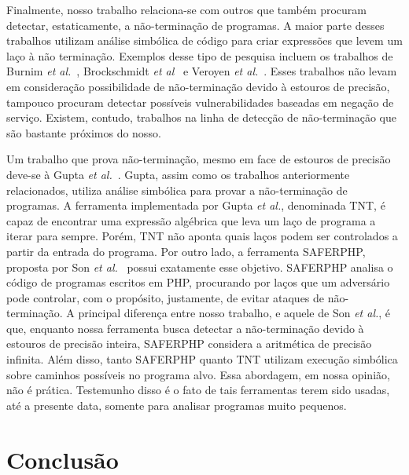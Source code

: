 \documentclass{llncs}
\begin{document}
Finalmente, nosso trabalho relaciona-se com outros que também procuram
detectar, estaticamente, a não-terminação de programas.
A maior parte desses trabalhos utilizam análise simbólica de código para criar
expressões que levem um laço à não terminação.
Exemplos desse tipo de pesquisa incluem os trabalhos de Burnim
{\em et al.}~\cite{Burnim09}, Brockschmidt {\em et al}~\cite{Brockschmidt11} e
Veroyen {\em et al.}~\cite{Velroyen08}.
Esses trabalhos não levam em consideração possibilidade de não-terminação
devido à estouros de precisão, tampouco procuram detectar possíveis
vulnerabilidades baseadas em negação de serviço.
Existem, contudo, trabalhos na linha de detecção de não-terminação que são
bastante próximos do nosso.

Um trabalho que prova não-terminação, mesmo em face de estouros de precisão
deve-se à Gupta {\em et al.}~\cite{Gupta08}.
Gupta, assim como os trabalhos anteriormente relacionados, utiliza análise
simbólica para provar a não-terminação de programas.
A ferramenta implementada por Gupta {\em et al.}, denominada TNT, é capaz de
encontrar uma expressão algébrica que leva um laço de programa a iterar
para sempre.
Porém, TNT não aponta quais laços podem ser controlados a partir da entrada
do programa.
Por outro lado, a ferramenta  SAFERPHP, proposta por Son
{\em et al.}~\cite{Son11} possui exatamente esse objetivo.
SAFERPHP analisa o código de programas escritos em PHP, procurando por laços
que um adversário pode controlar, com o propósito, justamente, de evitar
ataques de não-terminação.
A principal diferença entre nosso trabalho, e aquele de Son {\em et al.}, é
que, enquanto nossa ferramenta busca detectar a não-terminação devido à
estouros de precisão inteira, SAFERPHP considera a aritmética de
precisão infinita.
Além disso, tanto SAFERPHP quanto TNT utilizam execução simbólica sobre caminhos
possíveis no programa alvo.
Essa abordagem, em nossa opinião, não é prática.
Testemunho disso é o fato de tais ferramentas terem sido usadas, até a presente
data, somente para analisar programas muito pequenos.

\section{Conclusão}
\label{sec:con}
\end{document}
